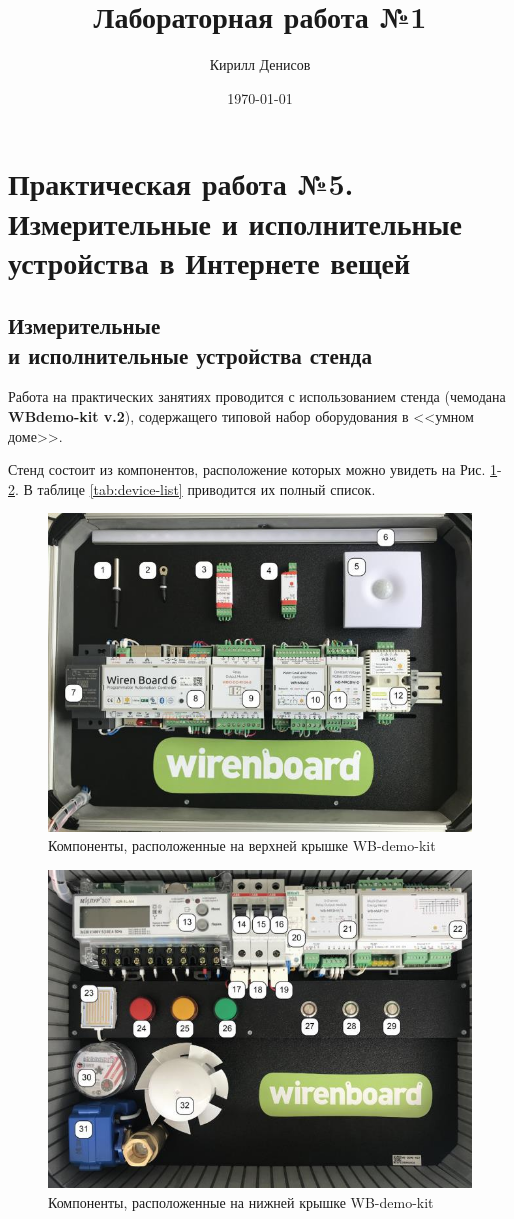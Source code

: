 \documentclass[a4paper,14pt]{extarticle}
\author{Кирилл Денисов}
\title{Лабораторная работа №1}
\date{\today}
\newcommand{\pathToCommonFolder}{/home/denilai/Documents/repos/latex/Common}
\begin{document}
	\thispagestyle{empty}
	
	\newpage
	\tableofcontents
	\newpage

\normalsize

\section{Практическая работа №5.\\Измерительные и исполнительные устройства в Интернете вещей}

\subsection {Измерительные \\и исполнительные устройства стенда}
Работа на практических занятиях проводится с использованием стенда (чемодана\textbf{ WBdemo-kit v.2}), содержащего типовой набор оборудования в <<умном доме>>.

Стенд состоит из компонентов, расположение которых можно увидеть на Рис. \ref{fig:wb-demo-kit1}-\ref{fig:wb-demo-kit2}. В таблице \ref{tab:device-list} приводится их полный список.
 
\begin{figure}[htpb]
	\centering
	\includegraphics[width=0.6\linewidth]{images/wb-demo-kit1}
	\caption{Компоненты, расположенные на верхней крышке WB-demo-kit}
	\label{fig:wb-demo-kit1}
\end{figure}
 
 \begin{figure}[htpb]
 	\centering
 	\includegraphics[width=0.6\linewidth]{images/wb-demo-kit2}
 	\caption{Компоненты, расположенные на нижней крышке WB-demo-kit}
 	\label{fig:wb-demo-kit2}
 \end{figure}
\end{document}
